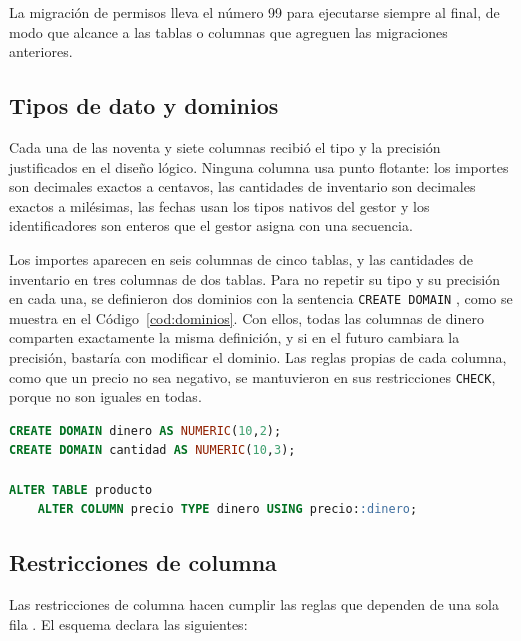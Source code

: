 La migración de permisos lleva el número 99 para ejecutarse siempre al final, de modo que alcance a las tablas o columnas que agreguen las migraciones anteriores.

\subsection{Tipos de dato y dominios}

Cada una de las noventa y siete columnas recibió el tipo y la precisión justificados en el diseño lógico. Ninguna columna usa punto flotante: los importes son decimales exactos a centavos, las cantidades de inventario son decimales exactos a milésimas, las fechas usan los tipos nativos del gestor y los identificadores son enteros que el gestor asigna con una secuencia.

Los importes aparecen en seis columnas de cinco tablas, y las cantidades de inventario en tres columnas de dos tablas. Para no repetir su tipo y su precisión en cada una, se definieron dos dominios con la sentencia \texttt{CREATE DOMAIN} \parencite{postgres_createdomain}, como se muestra en el Código~\ref{cod:dominios}. Con ellos, todas las columnas de dinero comparten exactamente la misma definición, y si en el futuro cambiara la precisión, bastaría con modificar el dominio. Las reglas propias de cada columna, como que un precio no sea negativo, se mantuvieron en sus restricciones \texttt{CHECK}, porque no son iguales en todas.

\begin{lstlisting}[style=codigoC, language=SQL, caption={Dominios de la migración \texttt{001-dominios.sql}}, label=cod:dominios]
CREATE DOMAIN dinero AS NUMERIC(10,2);
CREATE DOMAIN cantidad AS NUMERIC(10,3);

ALTER TABLE producto
    ALTER COLUMN precio TYPE dinero USING precio::dinero;
\end{lstlisting}

\subsection{Restricciones de columna}

Las restricciones de columna hacen cumplir las reglas que dependen de una sola fila \parencite{postgres_constraints}. El esquema declara las siguientes:

